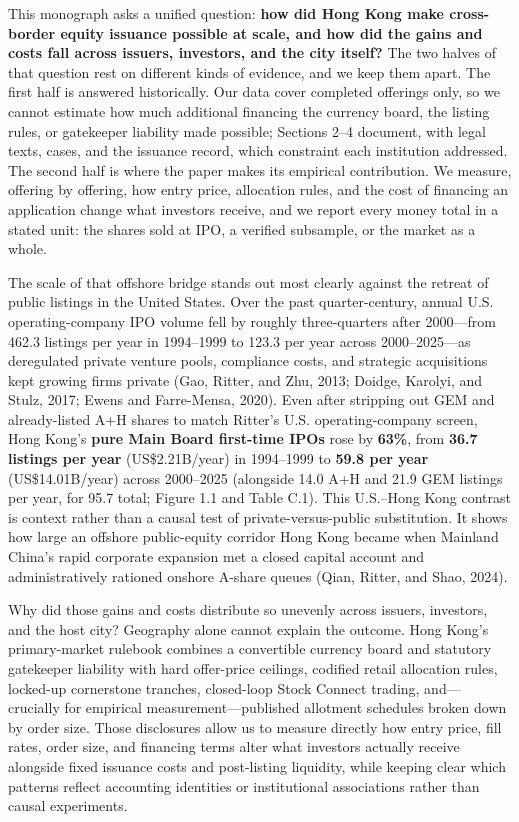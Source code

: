 \documentclass[11pt,letterpaper]{article}
\begin{document}
This monograph asks a unified question: \textbf{how did Hong Kong make cross-border equity issuance possible at scale, and how did the gains and costs fall across issuers, investors, and the city itself?} The two halves of that question rest on different kinds of evidence, and we keep them apart. The first half is answered historically. Our data cover completed offerings only, so we cannot estimate how much additional financing the currency board, the listing rules, or gatekeeper liability made possible; Sections 2–4 document, with legal texts, cases, and the issuance record, which constraint each institution addressed. The second half is where the paper makes its empirical contribution. We measure, offering by offering, how entry price, allocation rules, and the cost of financing an application change what investors receive, and we report every money total in a stated unit: the shares sold at IPO, a verified subsample, or the market as a whole.

The scale of that offshore bridge stands out most clearly against the retreat of public listings in the United States. Over the past quarter-century, annual U.S. operating-company IPO volume fell by roughly three-quarters after 2000—from 462.3 listings per year in 1994–1999 to 123.3 per year across 2000–2025—as deregulated private venture pools, compliance costs, and strategic acquisitions kept growing firms private (Gao, Ritter, and Zhu, 2013; Doidge, Karolyi, and Stulz, 2017; Ewens and Farre-Mensa, 2020). Even after stripping out GEM and already-listed A+H shares to match Ritter's U.S. operating-company screen, Hong Kong's \textbf{pure Main Board first-time IPOs} rose by \textbf{63\%}, from \textbf{36.7 listings per year} (US\$2.21B/year) in 1994–1999 to \textbf{59.8 per year} (US\$14.01B/year) across 2000–2025 (alongside 14.0 A+H and 21.9 GEM listings per year, for 95.7 total; Figure 1.1 and Table C.1). This U.S.–Hong Kong contrast is context rather than a causal test of private-versus-public substitution. It shows how large an offshore public-equity corridor Hong Kong became when Mainland China's rapid corporate expansion met a closed capital account and administratively rationed onshore A-share queues (Qian, Ritter, and Shao, 2024).

Why did those gains and costs distribute so unevenly across issuers, investors, and the host city? Geography alone cannot explain the outcome. Hong Kong's primary-market rulebook combines a convertible currency board and statutory gatekeeper liability with hard offer-price ceilings, codified retail allocation rules, locked-up cornerstone tranches, closed-loop Stock Connect trading, and—crucially for empirical measurement—published allotment schedules broken down by order size. Those disclosures allow us to measure directly how entry price, fill rates, order size, and financing terms alter what investors actually receive alongside fixed issuance costs and post-listing liquidity, while keeping clear which patterns reflect accounting identities or institutional associations rather than causal experiments.
\end{document}
